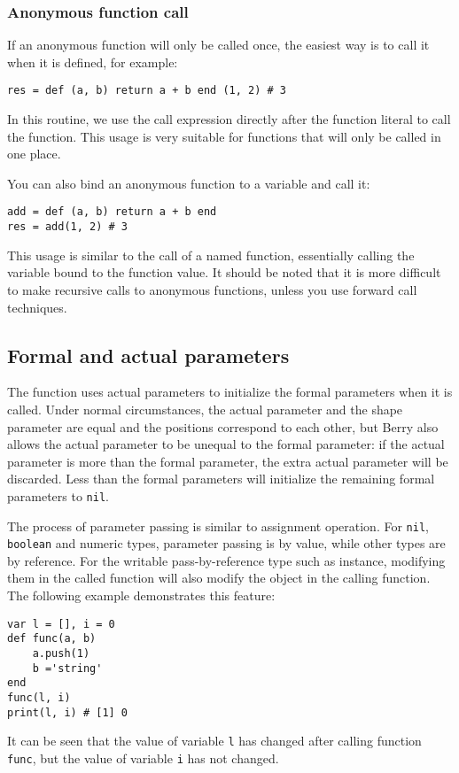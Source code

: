 \subsubsection {Anonymous function call}If an anonymous function will only be called once, the easiest way is to call it when it is defined, for example:
\begin{lstlisting}[language=berry, numbers=none]
res = def (a, b) return a + b end (1, 2) # 3
\end{lstlisting}
In this routine, we use the call expression directly after the function literal to call the function. This usage is very suitable for functions that will only be called in one place.

You can also bind an anonymous function to a variable and call it:
\begin{lstlisting}[language=berry, numbers=none]
add = def (a, b) return a + b end
res = add(1, 2) # 3
\end{lstlisting}
This usage is similar to the call of a named function, essentially calling the variable bound to the function value. It should be noted that it is more difficult to make recursive calls to anonymous functions, unless you use forward call techniques.

\subsection {Formal and actual parameters}

The function uses actual parameters to initialize the formal parameters when it is called. Under normal circumstances, the actual parameter and the shape parameter are equal and the positions correspond to each other, but Berry also allows the actual parameter to be unequal to the formal parameter: if the actual parameter is more than the formal parameter, the extra actual parameter will be discarded. Less than the formal parameters will initialize the remaining formal parameters to \texttt{nil}.

The process of parameter passing is similar to assignment operation. For \texttt{nil}, \texttt{boolean} and numeric types, parameter passing is by value, while other types are by reference. For the writable pass-by-reference type such as instance, modifying them in the called function will also modify the object in the calling function. The following example demonstrates this feature:
\begin{lstlisting}[language=berry]
var l = [], i = 0
def func(a, b)
    a.push(1)
    b ='string'
end
func(l, i)
print(l, i) # [1] 0
\end{lstlisting}
It can be seen that the value of variable \texttt{l} has changed after calling function \texttt{func}, but the value of variable \texttt{i} has not changed.

